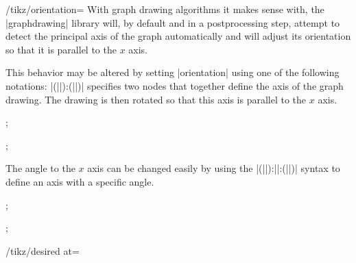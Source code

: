 \begin{key}{/tikz/orientation=}
  With graph drawing algorithms it makes sense with, the |graphdrawing|
  library will, by default and in a postprocessing step, attempt to
  detect the principal axis of the graph automatically and will adjust
  its orientation so that it is parallel to the $x$ axis.

  This behavior may be altered by setting |orientation| using one of
  the following notations:
  |(||):(||)| specifies
  two nodes that together define the axis of the graph drawing. The
  drawing is then rotated so that this axis is parallel to the $x$
  axis.
  \begin{codeexample}[]
\tikz {};
  \end{codeexample}
  \begin{codeexample}[]
\tikz {};
  \end{codeexample}
  The angle to the $x$ axis can be changed easily by using the
  |(||):||:(||)|
  syntax to define an axis with a specific angle.
  \begin{codeexample}[]
\tikz {};
  \end{codeexample}
  \begin{codeexample}[]
\tikz {};
  \end{codeexample}
\end{key}

\begin{key}{/tikz/desired at=}
\end{key}

